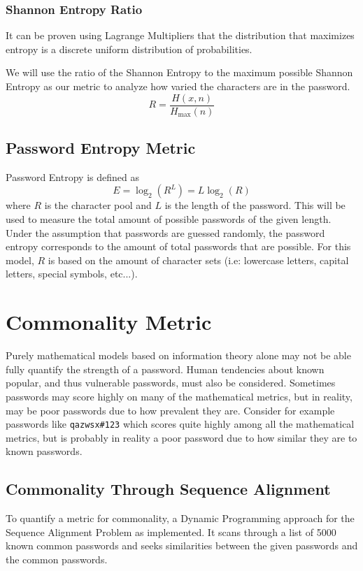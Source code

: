 \documentclass{article}
\begin{document}
\subsubsection{Shannon Entropy Ratio}
It can be proven using Lagrange Multipliers that the distribution that maximizes entropy is a discrete uniform distribution of probabilities. 

We will use the ratio of the Shannon Entropy to the maximum possible Shannon Entropy as our metric to analyze how varied the characters are in the password.
\[
R = \frac{H(x, n)}{H_{\text{max}}(n)}
\]

\subsection{Password Entropy Metric}
Password Entropy is defined as 
\[
E=\log_2(R^L) = L\log_2(R)
\]
where $R$ is the character pool and $L$ is the length of the password.
This will be used to measure the total amount of possible passwords of the given length. Under the assumption that passwords are guessed randomly, the password entropy corresponds to the amount of total passwords that are possible.  
For this model, $R$ is based on the amount of character sets (i.e: lowercase letters, capital letters, special symbols, etc...).

\section{Commonality Metric}
Purely mathematical models based on information theory alone may not be able fully quantify the strength of a password. Human tendencies about known popular, and thus vulnerable passwords, must also be considered. Sometimes passwords may score highly on many of the mathematical metrics, but in reality, may be poor passwords due to how prevalent they are. Consider for example passwords like 
\verb!qazwsx#123!
which scores quite highly among all the mathematical metrics, but is probably in reality a poor password due to how similar they are to known passwords.
\subsection{Commonality Through Sequence Alignment}
To quantify a metric for commonality, a Dynamic Programming approach for the Sequence Alignment Problem as implemented. It scans through a list of 5000 known common passwords and seeks similarities between the given passwords and the common passwords.
\end{document}
